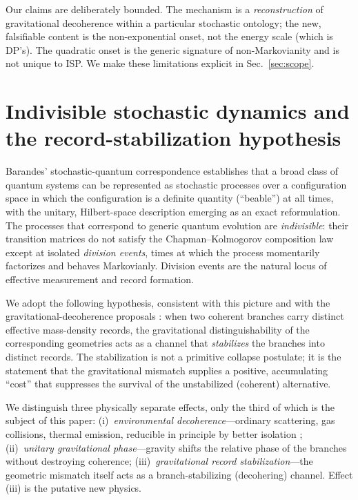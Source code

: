 \documentclass[aps,pra,preprint,amsmath,amssymb,nofootinbib,superscriptaddress]{revtex4-2}
\begin{document}
Our claims are deliberately bounded. The mechanism is a \emph{reconstruction} of
gravitational decoherence within a particular stochastic ontology; the new,
falsifiable content is the non-exponential onset, not the energy scale (which is
DP's). The quadratic onset is the generic signature of non-Markovianity and is
not unique to ISP. We make these limitations explicit in Sec.~\ref{sec:scope}.

\section{Indivisible stochastic dynamics and the record-stabilization
hypothesis}

Barandes' stochastic-quantum correspondence \cite{barandes2023corr,barandes2023thm}
establishes that a broad class of quantum systems can be represented as
stochastic processes over a configuration space in which the configuration is a
definite quantity (``beable'') at all times, with the unitary, Hilbert-space
description emerging as an exact reformulation. The processes that correspond to
generic quantum evolution are \emph{indivisible}: their transition matrices do
not satisfy the Chapman--Kolmogorov composition law except at isolated
\emph{division events}, times at which the process momentarily factorizes and
behaves Markovianly. Division events are the natural locus of effective
measurement and record formation.

We adopt the following hypothesis, consistent with this picture and with the
gravitational-decoherence proposals
\cite{penrose1996,diosi1989,diosi1987,bassigro2017}: when two coherent branches
carry distinct effective mass-density records, the gravitational
distinguishability of the corresponding geometries acts as a channel that
\emph{stabilizes} the branches into distinct records. The stabilization is not a
primitive collapse postulate; it is the statement that the gravitational mismatch
supplies a positive, accumulating ``cost'' that suppresses the survival of the
unstabilized (coherent) alternative.

We distinguish three physically separate effects, only the third of which is the
subject of this paper: (i)~\emph{environmental decoherence}---ordinary
scattering, gas collisions, thermal emission, reducible in principle by better
isolation \cite{zurek2003,arndt2014}; (ii)~\emph{unitary gravitational
phase}---gravity shifts the relative phase of the branches without destroying
coherence; (iii)~\emph{gravitational record stabilization}---the geometric
mismatch itself acts as a branch-stabilizing (decohering) channel. Effect (iii)
is the putative new physics.
\end{document}
